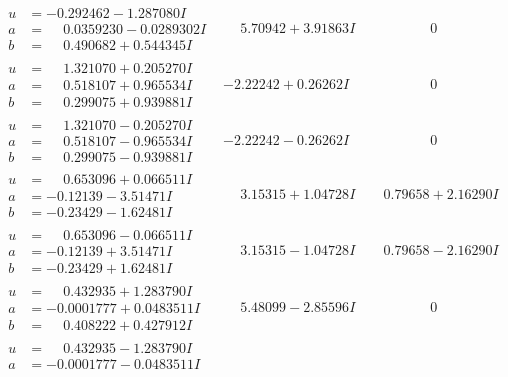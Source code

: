 \documentclass[1p]{elsarticle_modified}
\theoremstyle{definition}
\begin{document}
$$\begin{array}{c|c|c}
 \hline 
\begin{aligned}
u &= -0.292462 - 1.287080 I \\
a &= \phantom{-}0.0359230 - 0.0289302 I \\
b &= \phantom{-}0.490682 + 0.544345 I\end{aligned}
 & \phantom{-}5.70942 + 3.91863 I & \phantom{-0.000000 } 0 \\ \hline\begin{aligned}
u &= \phantom{-}1.321070 + 0.205270 I \\
a &= \phantom{-}0.518107 + 0.965534 I \\
b &= \phantom{-}0.299075 + 0.939881 I\end{aligned}
 & -2.22242 + 0.26262 I & \phantom{-0.000000 } 0 \\ \hline\begin{aligned}
u &= \phantom{-}1.321070 - 0.205270 I \\
a &= \phantom{-}0.518107 - 0.965534 I \\
b &= \phantom{-}0.299075 - 0.939881 I\end{aligned}
 & -2.22242 - 0.26262 I & \phantom{-0.000000 } 0 \\ \hline\begin{aligned}
u &= \phantom{-}0.653096 + 0.066511 I \\
a &= -0.12139 - 3.51471 I \\
b &= -0.23429 - 1.62481 I\end{aligned}
 & \phantom{-}3.15315 + 1.04728 I & \phantom{-}0.79658 + 2.16290 I \\ \hline\begin{aligned}
u &= \phantom{-}0.653096 - 0.066511 I \\
a &= -0.12139 + 3.51471 I \\
b &= -0.23429 + 1.62481 I\end{aligned}
 & \phantom{-}3.15315 - 1.04728 I & \phantom{-}0.79658 - 2.16290 I \\ \hline\begin{aligned}
u &= \phantom{-}0.432935 + 1.283790 I \\
a &= -0.0001777 + 0.0483511 I \\
b &= \phantom{-}0.408222 + 0.427912 I\end{aligned}
 & \phantom{-}5.48099 - 2.85596 I & \phantom{-0.000000 } 0 \\ \hline\begin{aligned}
u &= \phantom{-}0.432935 - 1.283790 I \\
a &= -0.0001777 - 0.0483511 I \\

\end{aligned}
\end{array}$$
\end{document}
